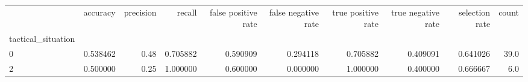 \begin{tabular}{lrrrrrrrrr}
\toprule
{} &  accuracy &  precision &    recall &  false positive rate &  false negative rate &  true positive rate &  true negative rate &  selection rate &  count \\
tactical\_situation &           &            &           &                      &                      &                     &                     &                 &        \\
\midrule
0                  &  0.538462 &       0.48 &  0.705882 &             0.590909 &             0.294118 &            0.705882 &            0.409091 &        0.641026 &   39.0 \\
2                  &  0.500000 &       0.25 &  1.000000 &             0.600000 &             0.000000 &            1.000000 &            0.400000 &        0.666667 &    6.0 \\
\bottomrule
\end{tabular}
